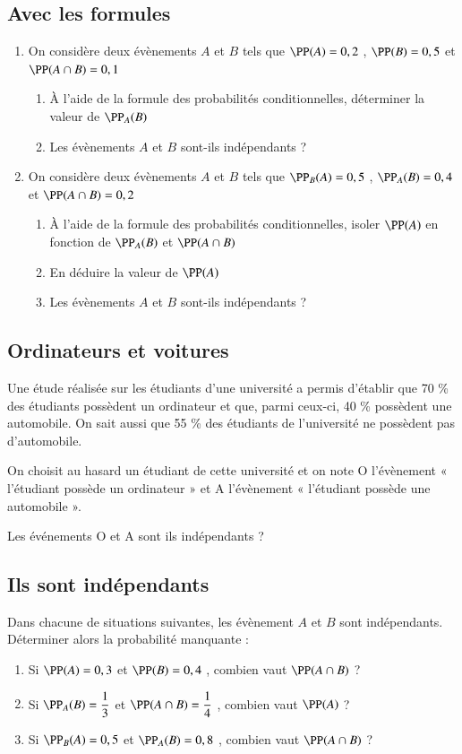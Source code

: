 \documentclass[oneside,12pt]{article}          %
\begin{document}
\subsection{Avec les formules}
\begin{enumerate}
	\item On considère deux évènements $A$ et $B$ tels que $\PP(A) = 0,2$ , $\PP(B) = 0,5$ et $\PP(A \cap B) = 0,1$
	\begin{enumerate}
		\item À l'aide de la formule des probabilités conditionnelles, déterminer la valeur de $\PP_A(B)$
		\item Les évènements $A$ et $B$ sont-ils indépendants ?
	\end{enumerate}
	\item On considère deux évènements $A$ et $B$ tels que $\PP_B(A) = 0,5$ , $\PP_A(B) = 0,4$ et $\PP(A \cap B) = 0,2$
	\begin{enumerate}
		\item À l'aide de la formule des probabilités conditionnelles, isoler $\PP(A)$ en fonction de $\PP_A(B)$ et $\PP(A \cap B)$
		\item En déduire la valeur de $\PP(A)$
		\item Les évènements $A$ et $B$ sont-ils indépendants ?
	\end{enumerate}	
\end{enumerate}


\subsection{Ordinateurs et voitures}
Une étude réalisée sur les étudiants d’une université a permis d’établir que 70 \% des étudiants possèdent un ordinateur et que, parmi ceux-ci, 40 \% possèdent une automobile. On sait aussi que 55 \% des étudiants de l’université ne possèdent pas d’automobile. 
 
On choisit au hasard un étudiant de cette université et on note O l’évènement « l’étudiant possède un ordinateur » et A l’évènement « l’étudiant possède une automobile ».

Les événements O et A sont ils indépendants ?



\subsection{Ils sont indépendants}
Dans chacune de situations suivantes, les évènement $A$ et $B$ sont indépendants. Déterminer alors la probabilité manquante :
\begin{enumerate}
	\item Si $\PP(A) = 0,3$  et $\PP(B) = 0,4$ , combien vaut  $\PP(A \cap B)$ ?
	\item Si $\PP_A(B)= \dfrac{1}{3}$ et $\PP(A \cap B) = \dfrac{1}{4}$ , combien vaut $\PP(A)$ ?
	\item Si $\PP_B(A) = 0,5$ et $\PP_A(B) = 0,8$ , combien vaut $\PP(A \cap B)$ ?
\end{enumerate}
\end{document}
